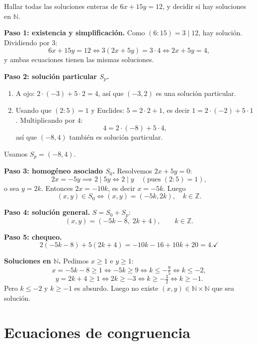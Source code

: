 \begin{ejemplo}
Hallar todas las soluciones enteras de $6x+15y=12$, y decidir si hay
soluciones en $\mathbb{N}$.

\textbf{Paso 1: existencia y simplificación.} Como $(6:15)=3 \mid 12$, hay
solución. Dividiendo por $3$:
\[
6x+15y=12 \iff 3(2x+5y)=3\cdot 4 \iff 2x+5y=4,
\]
y ambas ecuaciones tienen las mismas soluciones.

\textbf{Paso 2: solución particular $S_p$.}

\begin{enumerate}
    \item[a)] A ojo: $2\cdot(-3)+5\cdot 2=4$, así que $(-3,2)$ es una
    solución particular.
    \item[b)] Usando que $(2:5)=1$ y Euclides: $5=2\cdot 2+1$, es decir
    $1=2\cdot(-2)+5\cdot 1$. Multiplicando por $4$:
    \[
    4 = 2\cdot(-8)+5\cdot 4,
    \]
    así que $(-8,4)$ también es solución particular.
\end{enumerate}
Usamos $S_p=(-8,4)$.

\textbf{Paso 3: homogéneo asociado $S_0$.} Resolvemos $2x+5y=0$:
\[
2x=-5y \implies 2\mid 5y \iff 2\mid y \quad (\text{pues } (2:5)=1),
\]
o sea $y=2k$. Entonces $2x=-10k$, es decir $x=-5k$. Luego
\[
(x,y)\in S_0 \iff (x,y)=(-5k,2k), \quad k\in\mathbb{Z}.
\]

\textbf{Paso 4: solución general.} $S=S_0+S_p$:
\[
(x,y)=(-5k-8,\;2k+4), \qquad k\in\mathbb{Z}.
\]

\textbf{Paso 5: chequeo.}
\[
2(-5k-8)+5(2k+4) = -10k-16+10k+20 = 4. \checkmark
\]

\textbf{Soluciones en $\mathbb{N}$.} Pedimos $x\ge 1$ e $y\ge 1$:
\[
x=-5k-8\ge 1 \iff -5k\ge 9 \iff k\le -\tfrac95 \iff k\le -2,
\]
\[
y=2k+4\ge 1 \iff 2k\ge -3 \iff k\ge -\tfrac32 \iff k\ge -1.
\]
Pero $k\le -2$ y $k\ge -1$ es absurdo. Luego no existe $(x,y)\in\mathbb{N}\times\mathbb{N}$
que sea solución.
\end{ejemplo}

\section{Ecuaciones de congruencia}

